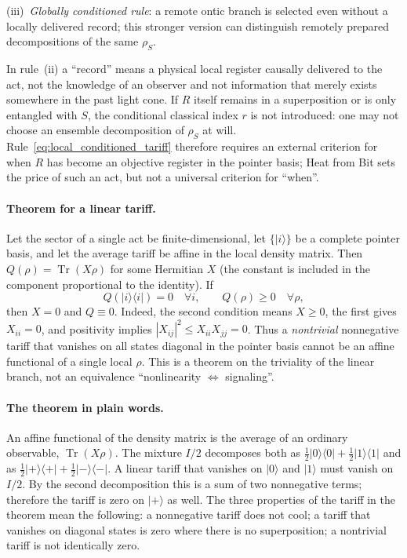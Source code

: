 \documentclass[11pt,a4paper]{article}
\begin{document}
(iii)~\emph{Globally conditioned rule}: a remote ontic branch is selected even without a locally delivered record; this stronger version can distinguish remotely prepared decompositions of the same $\rho_S$.

In rule~(ii) a ``record'' means a physical local register causally delivered to the act, not the knowledge of an observer and not information that merely exists somewhere in the past light cone. If $R$ itself remains in a superposition or is only entangled with $S$, the conditional classical index $r$ is not introduced: one may not choose an ensemble decomposition of $\rho_S$ at will. Rule~\eqref{eq:local_conditioned_tariff} therefore requires an external criterion for when $R$ has become an objective register in the pointer basis; Heat from Bit sets the price of such an act, but not a universal criterion for ``when''.

\paragraph{Theorem for a linear tariff.}
Let the sector of a single act be finite-dimensional, let $\{|i\rangle\}$ be a complete pointer basis, and let the average tariff be affine in the local density matrix. Then $Q(\rho)=\operatorname{Tr}(X\rho)$ for some Hermitian $X$ (the constant is included in the component proportional to the identity). If
\begin{equation}
Q(|i\rangle\langle i|)=0\quad\forall i,
\qquad
Q(\rho)\ge0\quad\forall\rho,
\label{eq:linear_tariff_conditions}
\end{equation}
then $X=0$ and $Q\equiv0$. Indeed, the second condition means $X\ge0$, the first gives $X_{ii}=0$, and positivity implies $|X_{ij}|^2\le X_{ii}X_{jj}=0$. Thus a \emph{nontrivial} nonnegative tariff that vanishes on all states diagonal in the pointer basis cannot be an affine functional of a single local $\rho$. This is a theorem on the triviality of the linear branch, not an equivalence ``nonlinearity $\Leftrightarrow$ signaling''.

\paragraph{The theorem in plain words.}
An affine functional of the density matrix is the average of an ordinary observable, $\operatorname{Tr}(X\rho)$. The mixture $I/2$ decomposes both as $\tfrac12|0\rangle\langle0|+\tfrac12|1\rangle\langle1|$ and as $\tfrac12|{+}\rangle\langle{+}|+\tfrac12|{-}\rangle\langle{-}|$. A linear tariff that vanishes on $|0\rangle$ and $|1\rangle$ must vanish on $I/2$. By the second decomposition this is a sum of two nonnegative terms; therefore the tariff is zero on $|{+}\rangle$ as well. The three properties of the tariff in the theorem mean the following: a nonnegative tariff does not cool; a tariff that vanishes on diagonal states is zero where there is no superposition; a nontrivial tariff is not identically zero.
\end{document}
